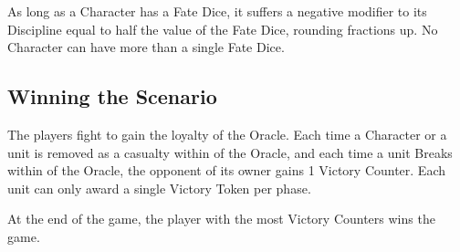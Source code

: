 As long as a Character has a Fate Dice, it suffers a negative modifier to its Discipline equal to half the value of the Fate Dice, rounding fractions up. No Character can have more than a single Fate Dice.

\subsection*{Winning the Scenario}

The players fight to gain the loyalty of the Oracle. Each time a Character or a unit is removed as a casualty within  of the Oracle, and each time a unit Breaks within  of the Oracle, the opponent of its owner gains 1 Victory Counter. Each unit can only award a single Victory Token per phase.

At the end of the game, the player with the most Victory Counters wins the game.
